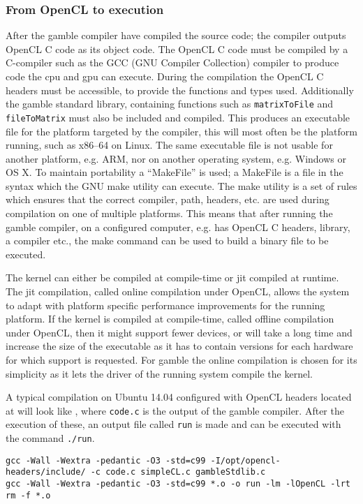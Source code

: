 \subsubsection*{From OpenCL to execution}\label{ssub:makefile}
After the \gls{gamble} compiler have compiled the source code; the compiler outputs OpenCL C code as its object code.
The OpenCL C code must be compiled by a C-compiler such as the GCC (GNU Compiler Collection) compiler to produce code the \acrshort{cpu} and \acrshort{gpu} can execute.
During the compilation the OpenCL C headers must be accessible, to provide the functions and types used. 
Additionally the \gls{gamble} standard library, containing functions such as \texttt{matrixToFile} and \texttt{fileToMatrix} must also be included and compiled. 
This produces an executable file for the platform targeted by the compiler, this will most often be the platform running, such as x86--64 on Linux.
The same executable file is not usable for another platform, e.g. ARM, nor on another operating system, e.g. Windows or OS X.
To maintain portability a ``MakeFile'' is used; a MakeFile is a file in the syntax which the GNU make utility can execute. 
The make utility is a set of rules which ensures that the correct compiler, path, headers, etc. are used during compilation on one of multiple platforms. 
This means that after running the \gls{gamble} compiler, on a configured computer, e.g. has OpenCL C headers, library, a compiler etc., the make command can be used to build a binary file to be executed.

The kernel can either be compiled at compile-time or \acrshort{jit} compiled at runtime.
The \acrshort{jit} compilation, called online compilation under OpenCL, allows the system to adapt with platform specific performance improvements for the running platform.
If the kernel is compiled at compile-time, called offline compilation under OpenCL, then it might support fewer devices, or will take a long time and increase the size of the executable as it has to contain versions for each hardware for which support is requested. \citep{openclbookjit}
For \gls{gamble} the online compilation is chosen for its simplicity as it lets the driver of the running system compile the kernel. 

A typical compilation on Ubuntu 14.04 configured with OpenCL headers located at  will look like , where \texttt{code.c} is the output of the \gls{gamble} compiler.
After the execution of these, an output file called \texttt{run} is made and can be executed with the command \texttt{./run}. 

\begin{lstlisting}[caption=The commands executed by the make command according to the rules of the MakeFile,numbers=none,frame=tlrb,label={lst:makecommands}]
gcc -Wall -Wextra -pedantic -O3 -std=c99 -I/opt/opencl-headers/include/ -c code.c simpleCL.c gambleStdlib.c
gcc -Wall -Wextra -pedantic -O3 -std=c99 *.o -o run -lm -lOpenCL -lrt
rm -f *.o
\end{lstlisting}
